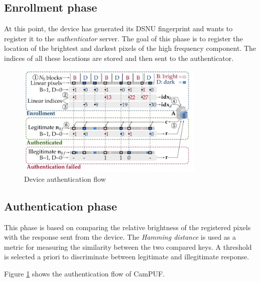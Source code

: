 \subsection{Enrollment phase}
At this point, the device has generated its DSNU fingerprint and wants to register it to the \textit{authenticator} server.
The goal of this phase is to register the location of the brightest and darkest pixels of the high frequency component. The indices of all these locations are stored
and then sent to the authenticator.

\begin{figure}[h!]    
    \centering
    \includegraphics[width=0.8\textwidth]{images/device_auth_flow.jpg}
    \caption{Device authentication flow}
    \label{fig:authflow}
\end{figure}

\subsection{Authentication phase}
This phase is based on comparing the relative brightness of the registered pixels with the response sent from the device. The \textit{Hamming distance} is used as a
metric for measuring the similarity between the two compared keys. A threshold is selected a priori to discriminate between legitimate and illegitimate response.

Figure \ref{fig:authflow} shows the authentication flow of CamPUF.
